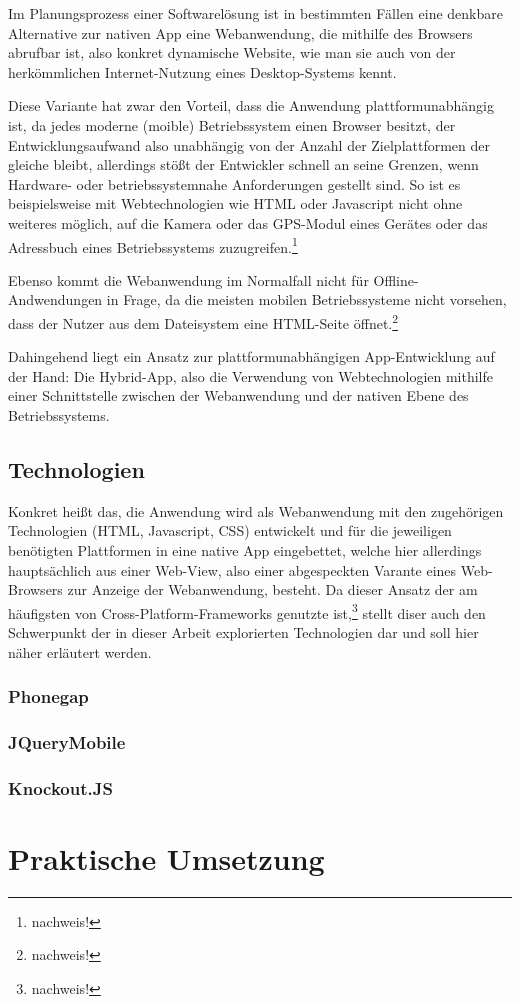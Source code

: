 \documentclass{article}
\begin{document}
Im Planungsprozess einer Softwarel\"{o}sung ist in bestimmten F\"{a}llen eine denkbare Alternative zur nativen App eine Webanwendung, die mithilfe des Browsers abrufbar ist, also konkret dynamische Website, wie man sie auch von der herk\"{o}mmlichen Internet-Nutzung eines Desktop-Systems kennt. 

Diese Variante hat zwar den Vorteil, dass die Anwendung plattformunabh\"{a}ngig ist, da jedes moderne (moible) Betriebssystem einen Browser besitzt, der Entwicklungsaufwand also unabh\"{a}ngig von der Anzahl der Zielplattformen der gleiche bleibt, allerdings st\"{o}ßt der Entwickler schnell an seine Grenzen, wenn Hardware- oder betriebssystemnahe Anforderungen gestellt sind. So ist es beispielsweise mit Webtechnologien wie HTML oder Javascript nicht ohne weiteres m\"{o}glich, auf die Kamera oder das GPS-Modul eines Ger\"{a}tes oder das Adressbuch eines Betriebssystems zuzugreifen.\footnote{nachweis!}

Ebenso kommt die Webanwendung im Normalfall nicht f\"{u}r Offline-Andwendungen in Frage, da die meisten mobilen Betriebssysteme nicht vorsehen, dass der Nutzer aus dem Dateisystem eine HTML-Seite \"{o}ffnet.\footnote{nachweis!}

Dahingehend liegt ein Ansatz zur plattformunabh\"{a}ngigen App-Entwicklung auf der Hand: Die Hybrid-App, also die Verwendung von Webtechnologien mithilfe einer Schnittstelle zwischen der Webanwendung und der nativen Ebene des Betriebssystems.

\subsection{Technologien}
Konkret heißt das, die Anwendung wird als Webanwendung mit den zugeh\"{o}rigen Technologien (HTML, Javascript, CSS) entwickelt und f\"{u}r die jeweiligen ben\"{o}tigten Plattformen in eine native App eingebettet, welche hier allerdings haupts\"{a}chlich aus einer Web-View, also einer abgespeckten Varante eines Web-Browsers zur Anzeige der Webanwendung, besteht. Da dieser Ansatz der am h\"{a}ufigsten von Cross-Platform-Frameworks genutzte ist,\footnote{nachweis!} stellt diser auch den Schwerpunkt der in dieser Arbeit explorierten Technologien dar und soll hier n\"{a}her erl\"{a}utert werden. 

\subsubsection{Phonegap}


\subsubsection{JQueryMobile}


\subsubsection{Knockout.JS}




\section{Praktische Umsetzung}
\end{document}
